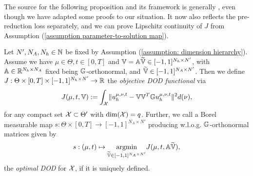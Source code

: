 The source for the following proposition and its framework is generally \cite{franco2024}, even though
we have adapted some proofs to our situation. It now also reflects
the pre-reduction loss separately, and we can prove Lipschitz continuity of $J$ 
from Assumption (\ref{assumption parameter-to-solution map}).

\begin{definition} \label{def: DOD functional}
    Let $N', N_A, N_h \in \mathbb{N}$ be fixed by Assumption (\ref{assumption: dimension hierarchy}). 
    Assume we have $\mu \in \Theta, t \in [0, T]$ and $\mathbb{V} = \mathbb{A} \widetilde{\mathbb{V}} \in [-1, 1]^{N_h \times N'}$, with
    $\mathbb{A} \in \mathbb{R}^{N_h \times N_A}$ fixed being $\mathbb{G}$-orthonormal, and $\widetilde{\mathbb{V}} \in [-1, 1]^{N_A \times N'}$. Then 
    we define $J: \Theta \times [0, T] \times [-1, 1]^{N_h \times N'} \to \mathbb{R}$ the \emph{objective DOD functional} via
    \begin{equation*}
        J(\mu, t, \mathbb{V}) := \int_{\mathcal{X}} \lVert u_h^{\mu, \nu, t} - \mathbb{V} \mathbb{V}^T \mathbb{G} u_h^{\mu, \nu, t} \rVert^2 d(\nu),
    \end{equation*}
    for any compact set $\mathcal{X} \subset \Theta'$ with $\text{dim}(\mathcal{X}) = q$.
    Further, we call a Borel measurable map $s: \Theta \times [0, T] \to [-1, 1]^{N_A \times N'}$ 
    producing w.l.o.g. $\mathbb{G}$-orthonormal
    matrices given by
    \begin{equation*}
        s: (\mu, t) \mapsto \underset{{\widetilde{\mathbb{V}} \in [-1, 1]^{N_A \times N'}}}{\text{argmin}}  
        J(\mu, t, \mathbb{A} \widetilde{\mathbb{V}}),
    \end{equation*}
    the \emph{optimal DOD} for $\mathcal{X}$, if it is uniquely defined.
\end{definition}



